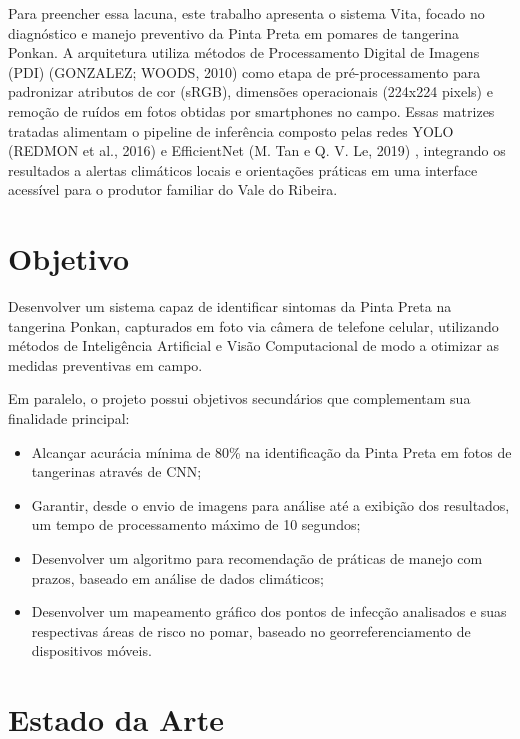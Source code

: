 \documentclass[11pt,a4paper]{article}
\begin{document}
Para preencher essa lacuna, este trabalho apresenta o sistema Vita, focado no diagnóstico e manejo preventivo da Pinta Preta em pomares de tangerina Ponkan. A arquitetura utiliza métodos de Processamento Digital de Imagens (PDI)  (GONZALEZ; WOODS, 2010) \cite{Gonzalez2010} como etapa de pré-processamento para padronizar atributos de cor (sRGB), dimensões  operacionais (224x224 pixels) e remoção de ruídos em fotos obtidas por smartphones no campo. Essas matrizes tratadas alimentam o pipeline de inferência composto pelas redes YOLO  (REDMON et al., 2016) e EfficientNet (M. Tan e Q. V. Le, 2019) \cite{TanLe2019},  integrando os resultados a alertas climáticos locais e orientações práticas em uma interface acessível para o produtor familiar do Vale do Ribeira.

\section{Objetivo}

Desenvolver um sistema capaz de identificar sintomas da Pinta Preta na tangerina Ponkan, capturados em foto via câmera de telefone celular, utilizando métodos de Inteligência Artificial e Visão Computacional de modo a otimizar as medidas preventivas em campo. 

Em paralelo, o projeto possui objetivos secundários que complementam sua finalidade principal:

\begin{itemize}
    
\item Alcançar acurácia mínima de 80\% na identificação da Pinta Preta em fotos de tangerinas através de CNN;
\item Garantir, desde o envio de imagens para análise até a exibição dos resultados, um tempo de processamento máximo de 10 segundos;
\item Desenvolver um algoritmo para recomendação de práticas de manejo com prazos, baseado em análise de dados climáticos;
\item Desenvolver um mapeamento gráfico dos pontos de infecção analisados e suas respectivas áreas de risco no pomar, baseado no georreferenciamento de dispositivos móveis.

\end{itemize}

\section{Estado da Arte}
\end{document}
